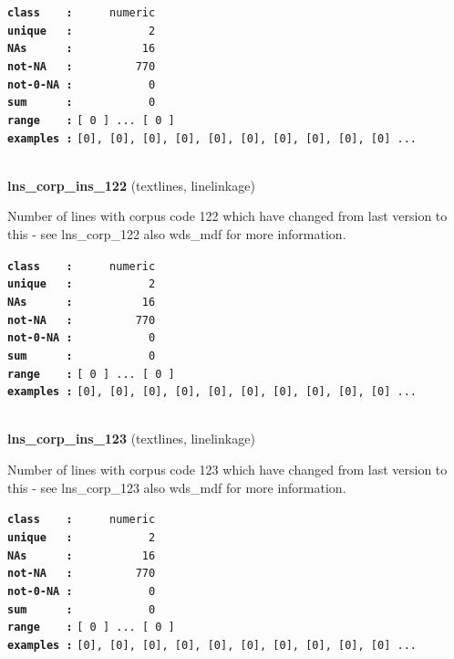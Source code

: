 \documentclass[]{article}
\begin{document}
\textbf{\texttt{class\ \ \ \ :}} \texttt{~~~~~numeric}\\
\textbf{\texttt{unique\ \ \ :}} \texttt{~~~~~~~~~~~2}\\
\textbf{\texttt{NAs\ \ \ \ \ \ :}} \texttt{~~~~~~~~~~16}\\
\textbf{\texttt{not-NA\ \ \ :}} \texttt{~~~~~~~~~770}\\
\textbf{\texttt{not-0-NA\ :}} \texttt{~~~~~~~~~~~0}\\
\textbf{\texttt{sum\ \ \ \ \ \ :}} \texttt{~~~~~~~~~~~0}\\
\textbf{\texttt{range\ \ \ \ :}}
\texttt{{[}\ 0\ {]}\ ...\ {[}\ 0\ {]}}\\
\textbf{\texttt{examples\ :}}
\texttt{{[}0{]},\ {[}0{]},\ {[}0{]},\ {[}0{]},\ {[}0{]},\ {[}0{]},\ {[}0{]},\ {[}0{]},\ {[}0{]},\ {[}0{]}\ ...}\\

~

\textbf{lns\_corp\_ins\_122} (textlines, linelinkage)

Number of lines with corpus code 122 which have changed from last
version to this - see lns\_corp\_122 also wds\_mdf for more information.

\textbf{\texttt{class\ \ \ \ :}} \texttt{~~~~~numeric}\\
\textbf{\texttt{unique\ \ \ :}} \texttt{~~~~~~~~~~~2}\\
\textbf{\texttt{NAs\ \ \ \ \ \ :}} \texttt{~~~~~~~~~~16}\\
\textbf{\texttt{not-NA\ \ \ :}} \texttt{~~~~~~~~~770}\\
\textbf{\texttt{not-0-NA\ :}} \texttt{~~~~~~~~~~~0}\\
\textbf{\texttt{sum\ \ \ \ \ \ :}} \texttt{~~~~~~~~~~~0}\\
\textbf{\texttt{range\ \ \ \ :}}
\texttt{{[}\ 0\ {]}\ ...\ {[}\ 0\ {]}}\\
\textbf{\texttt{examples\ :}}
\texttt{{[}0{]},\ {[}0{]},\ {[}0{]},\ {[}0{]},\ {[}0{]},\ {[}0{]},\ {[}0{]},\ {[}0{]},\ {[}0{]},\ {[}0{]}\ ...}\\

~

\textbf{lns\_corp\_ins\_123} (textlines, linelinkage)

Number of lines with corpus code 123 which have changed from last
version to this - see lns\_corp\_123 also wds\_mdf for more information.

\textbf{\texttt{class\ \ \ \ :}} \texttt{~~~~~numeric}\\
\textbf{\texttt{unique\ \ \ :}} \texttt{~~~~~~~~~~~2}\\
\textbf{\texttt{NAs\ \ \ \ \ \ :}} \texttt{~~~~~~~~~~16}\\
\textbf{\texttt{not-NA\ \ \ :}} \texttt{~~~~~~~~~770}\\
\textbf{\texttt{not-0-NA\ :}} \texttt{~~~~~~~~~~~0}\\
\textbf{\texttt{sum\ \ \ \ \ \ :}} \texttt{~~~~~~~~~~~0}\\
\textbf{\texttt{range\ \ \ \ :}}
\texttt{{[}\ 0\ {]}\ ...\ {[}\ 0\ {]}}\\
\textbf{\texttt{examples\ :}}
\texttt{{[}0{]},\ {[}0{]},\ {[}0{]},\ {[}0{]},\ {[}0{]},\ {[}0{]},\ {[}0{]},\ {[}0{]},\ {[}0{]},\ {[}0{]}\ ...}\\
\end{document}
